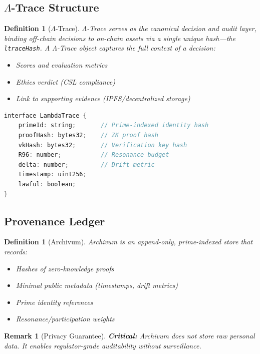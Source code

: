 \documentclass[11pt,a4paper]{article}
\newtheorem{definition}[theorem]{Definition}
\newtheorem{remark}[theorem]{Remark}
\newcommand{\Archivum}{\textsf{Archivum}}
\begin{document}
\subsection{$\Lambda$-Trace Structure}

\begin{definition}[$\Lambda$-Trace]
$\Lambda$-Trace serves as the canonical decision and audit layer, binding off-chain decisions to on-chain assets via a single unique hash---the \texttt{ltraceHash}. A $\Lambda$-Trace object captures the full context of a decision:
\begin{itemize}[noitemsep]
    \item Scores and evaluation metrics
    \item Ethics verdict (CSL compliance)
    \item Link to supporting evidence (IPFS/decentralized storage)
\end{itemize}
\end{definition}

\begin{lstlisting}[language=C,caption={$\Lambda$-Trace Interface (TypeScript)}]
interface LambdaTrace {
    primeId: string;       // Prime-indexed identity hash
    proofHash: bytes32;    // ZK proof hash
    vkHash: bytes32;       // Verification key hash
    R96: number;           // Resonance budget
    delta: number;         // Drift metric
    timestamp: uint256;
    lawful: boolean;
}
\end{lstlisting}

\subsection{Provenance Ledger}

\begin{definition}[\Archivum{}]
\Archivum{} is an append-only, prime-indexed store that records:
\begin{itemize}[noitemsep]
    \item Hashes of zero-knowledge proofs
    \item Minimal public metadata (timestamps, drift metrics)
    \item Prime identity references
    \item Resonance/participation weights
\end{itemize}
\end{definition}

\begin{remark}[Privacy Guarantee]
\textbf{Critical:} \Archivum{} does not store raw personal data. It enables regulator-grade auditability without surveillance.
\end{remark}
\end{document}
